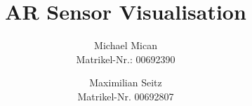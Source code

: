 \documentclass[titlepage]{scrartcl}
\begin{document}
	\titlehead{Technische Hochschule Deggendorf}
	\subject{Documentation}
	\title{AR Sensor Visualisation}
	\author{Michael Mican\\Matrikel-Nr.: 00692390 \and Maximilian Seitz\\Matrikel-Nr. 00692807}
	\publishers{Technische Hochschule Deggendorf\\Advisor: Prof. Dr. Peter Faber}
	
	\maketitle
	
	\tableofcontents
	\pagebreak
	
	
	
	
	
	
	
	
	
	
	
	\pagebreak
	
\end{document}
